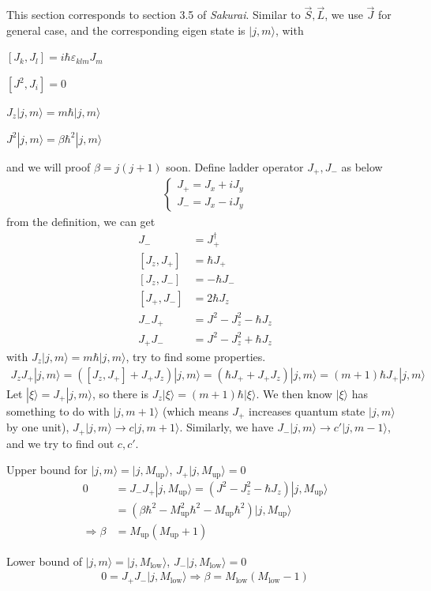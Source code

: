 \documentclass[UTF8,12pt]{article} %
\begin{document}
This section corresponds to section 3.5 of \textit{Sakurai}. Similar to $\vec{S}, \vec{L}$, we use $\vec{J}$ for general case, and the corresponding eigen state is $|j,m\rangle$, with
\begin{enumerate*}
\item $[J_{k}, J_{l}] = i\hbar\varepsilon_{klm}J_{m}$
\item $[J^{2}, J_{i}] = 0$
\item $J_{z}|j,m\rangle = m\hbar|j,m\rangle$
\item $J^{2}|j,m\rangle = \beta\hbar^{2}|j,m\rangle$
\end{enumerate*}
and we will proof $\beta = j(j + 1)$ soon. Define ladder operator $J_{+}, J_{-}$ as below
\begin{align}
\begin{cases}
J_{+} = J_{x} + iJ_{y} \\
J_{-} = J_{x} - iJ_{y}
\end{cases}
\end{align}
from the definition, we can get
\begin{align}
J_{-} &= J_{+}^{\dag} \\
[J_{z}, J_{+}] &= \hbar J_{+} \\
[J_{z}, J_{-}] &= -\hbar J_{-} \\
[J_{+}, J_{-}] &= 2\hbar J_{z} \\
J_{-}J_{+} &= J^{2} - J_{z}^{2} - \hbar J_{z} \\
J_{+}J_{-} &= J^{2} - J_{z}^{2} + \hbar J_{z}
\end{align}
with $J_{z}|j,m\rangle = m\hbar|j,m\rangle$, try to find some properties.
\begin{align}
J_{z}J_{+}|j,m\rangle = \left([J_{z}, J_{+}] + J_{+}J_{z}\right)|j,m\rangle = (\hbar J_{+} + J_{+}J_{z})|j,m\rangle = (m+1)\hbar J_{+}|j,m\rangle
\end{align}
Let $|\xi\rangle = J_{+}|j,m\rangle$, so there is $J_{z}|\xi\rangle = (m+1)\hbar|\xi\rangle$. We then know $|\xi\rangle$ has something to do with $|j,m+1\rangle$ (which means $J_{+}$ increases quantum state $|j,m\rangle$ by one unit), $J_{+}|j,m\rangle \rightarrow c|j,m+1\rangle$. Similarly, we have $J_{-}|j,m\rangle \rightarrow c'|j,m-1\rangle$, and we try to find out $c, c'$.
\begin{enumerate*}
\item Upper bound for $|j,m\rangle = |j,M_{\text{up}}\rangle$, $J_{+}|j,M_{\text{up}}\rangle = 0$
\begin{align}
0 &= J_{-}J_{+}|j,M_{\text{up}}\rangle = \left(J^{2} - J_{z}^{2} - \hbar J_{z}\right)|j,M_{\text{up}}\rangle \\
&= \left(\beta\hbar^{2} - M_{\text{up}}^{2}\hbar^{2} - M_{\text{up}}\hbar^{2}\right)|j,M_{\text{up}}\rangle \\
\Rightarrow \beta &= M_{\text{up}}(M_{\text{up}} + 1)
\end{align}
\item Lower bound of $|j,m\rangle = |j,M_{\text{low}}\rangle$, $J_{-}|j,M_{\text{low}}\rangle = 0$
\begin{align}
0 = J_{+}J_{-}|j,M_{\text{low}}\rangle \Rightarrow \beta = M_{\text{low}}(M_{\text{low}} - 1) 
\end{align}
\end{enumerate*}
\end{document}
